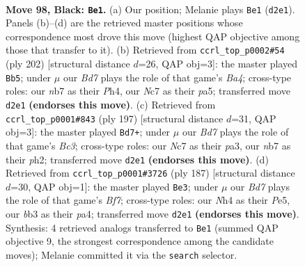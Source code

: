 \documentclass[11pt]{article}
\begin{document}
\clearpage

\begin{figure}[p]\centering
\begin{subfigure}{0.46\textwidth}\centering
\resizebox{\linewidth}{!}{%
\newchessgame
\chessboard[
  setfen={8/1Nn5/7k/8/Pp2P2n/1B2p3/1K1b3p/8 b - - 5 98},
  showmover=false,
  pgfstyle=straightmove, color=movearrow, markmove={d2-e1}
]}
\caption{}
\end{subfigure}\hfill
\begin{subfigure}{0.46\textwidth}\centering
\resizebox{\linewidth}{!}{%
\newchessgame
\chessboard[
  setfen={8/8/6k1/p1b2p2/B4P1P/1P6/6KP/8 w - - 3 102},
  showmover=false,
  pgfstyle=straightmove, color=movearrow, markmove={a4-b5}
]}
\caption{}
\end{subfigure}
\\[4pt]
\begin{subfigure}{0.46\textwidth}\centering
\resizebox{\linewidth}{!}{%
\newchessgame
\chessboard[
  setfen={8/1p6/2b3k1/1p6/6K1/P1B5/1P5P/8 b - - 56 99},
  showmover=false,
  pgfstyle=straightmove, color=movearrow, markmove={c6-d7}
]}
\caption{}
\end{subfigure}\hfill
\begin{subfigure}{0.46\textwidth}\centering
\resizebox{\linewidth}{!}{%
\newchessgame
\chessboard[
  setfen={8/8/8/p3p3/P1K1P1Bp/7P/5b2/4k3 b - - 84 94},
  showmover=false,
  pgfstyle=straightmove, color=movearrow, markmove={f2-e3}
]}
\caption{}
\end{subfigure}
\caption{\textbf{Move 98, Black: \texttt{Be1}.} (a) Our position; Melanie plays \texttt{Be1} (\texttt{d2e1}). Panels (b)--(d) are the retrieved master positions whose correspondence most drove this move (highest QAP objective among those that transfer to it). (b) Retrieved from \texttt{ccrl\_top\_p0002\#54} (ply 202) [structural distance $d$=26, QAP obj=3]: the master played \texttt{Bb5}; under $\mu$ our \emph{Bd7} plays the role of that game's \emph{Ba4}; cross-type roles: our \emph{n}b7 as their \emph{P}h4, our \emph{N}c7 as their \emph{p}a5; transferred move \texttt{d2e1} \textbf{(endorses this move)}. (c) Retrieved from \texttt{ccrl\_top\_p0001\#843} (ply 197) [structural distance $d$=31, QAP obj=3]: the master played \texttt{Bd7+}; under $\mu$ our \emph{Bd7} plays the role of that game's \emph{Bc3}; cross-type roles: our \emph{N}c7 as their \emph{p}a3, our \emph{n}b7 as their \emph{p}h2; transferred move \texttt{d2e1} \textbf{(endorses this move)}. (d) Retrieved from \texttt{ccrl\_top\_p0001\#3726} (ply 187) [structural distance $d$=30, QAP obj=1]: the master played \texttt{Be3}; under $\mu$ our \emph{Bd7} plays the role of that game's \emph{Bf7}; cross-type roles: our \emph{N}h4 as their \emph{P}e5, our \emph{b}b3 as their \emph{p}a4; transferred move \texttt{d2e1} \textbf{(endorses this move)}. Synthesis: 4 retrieved analogs transferred to \texttt{Be1} (summed QAP objective 9, the strongest correspondence among the candidate moves); Melanie committed it via the \texttt{search} selector.}
\label{fig:thought-m195}
\end{figure}
\end{document}
